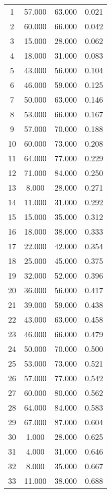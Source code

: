 % 
\begin{tabular}{cccc}
  \hline
  \hline
1 & 57.000 & 63.000 & 0.021 \\ 
  2 & 60.000 & 66.000 & 0.042 \\ 
  3 & 15.000 & 28.000 & 0.062 \\ 
  4 & 18.000 & 31.000 & 0.083 \\ 
  5 & 43.000 & 56.000 & 0.104 \\ 
  6 & 46.000 & 59.000 & 0.125 \\ 
  7 & 50.000 & 63.000 & 0.146 \\ 
  8 & 53.000 & 66.000 & 0.167 \\ 
  9 & 57.000 & 70.000 & 0.188 \\ 
  10 & 60.000 & 73.000 & 0.208 \\ 
  11 & 64.000 & 77.000 & 0.229 \\ 
  12 & 71.000 & 84.000 & 0.250 \\ 
  13 & 8.000 & 28.000 & 0.271 \\ 
  14 & 11.000 & 31.000 & 0.292 \\ 
  15 & 15.000 & 35.000 & 0.312 \\ 
  16 & 18.000 & 38.000 & 0.333 \\ 
  17 & 22.000 & 42.000 & 0.354 \\ 
  18 & 25.000 & 45.000 & 0.375 \\ 
  19 & 32.000 & 52.000 & 0.396 \\ 
  20 & 36.000 & 56.000 & 0.417 \\ 
  21 & 39.000 & 59.000 & 0.438 \\ 
  22 & 43.000 & 63.000 & 0.458 \\ 
  23 & 46.000 & 66.000 & 0.479 \\ 
  24 & 50.000 & 70.000 & 0.500 \\ 
  25 & 53.000 & 73.000 & 0.521 \\ 
  26 & 57.000 & 77.000 & 0.542 \\ 
  27 & 60.000 & 80.000 & 0.562 \\ 
  28 & 64.000 & 84.000 & 0.583 \\ 
  29 & 67.000 & 87.000 & 0.604 \\ 
  30 & 1.000 & 28.000 & 0.625 \\ 
  31 & 4.000 & 31.000 & 0.646 \\ 
  32 & 8.000 & 35.000 & 0.667 \\ 
  33 & 11.000 & 38.000 & 0.688 \\ 

\end{tabular}
